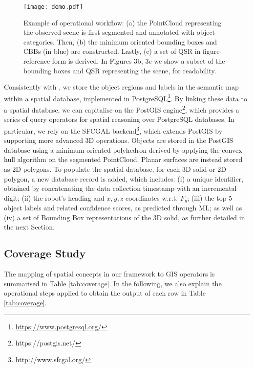 \documentclass{article}
\begin{document}
\begin{figure*}[t]
  \texttt{[image: demo.pdf]}
  \caption{Example of operational workflow: (a) the PointCloud representing the observed scene is first segmented and annotated with object categories. Then, (b) the minimum oriented bounding boxes and CBBs (in blue) are constructed. Lastly, (c) a set of QSR in figure-reference form is derived. In Figures 3b, 3c we show a subset of the bounding boxes and QSR representing the scene, for readability.}
  \label{fig:robot} 
\end{figure*}

Consistently with \cite{deeken_grounding_2018}, we store the object regions and labels in the semantic map within a spatial database, implemented in PostgreSQL\footnote{\url{https://www.postgresql.org/}}. By linking these data to a spatial database, we can capitalise on the PostGIS engine\footnote{https://postgis.net/}, which provides a series of query operators for spatial reasoning over PostgreSQL databases. In particular, we rely on the SFCGAL backend\footnote{http://www.sfcgal.org/}, which extends PostGIS by supporting more advanced 3D operations. Objects are stored in the PostGIS database using a minimum oriented polyhedron derived by applying the convex hull algorithm on the segmented PointCloud. Planar surfaces are instead stored as 2D polygons. To populate the spatial database, for each 3D solid or 2D polygon, a new database record is added, which includes: (i) a unique identifier, obtained by concatenating the data collection timestamp with an incremental digit; (ii) the robot's heading and $x,y,z$ coordinates w.r.t. $F_g$; (iii) the top-5 object labels and related confidence scores, as predicted through ML; as well as (iv) a set of Bounding Box representations of the 3D solid, as further detailed in the next Section.  

\subsection{Coverage Study}%
The mapping of spatial concepts in our framework to GIS operators is summarised in Table \ref{tab:coverage}. In the following, we also explain the operational steps applied to obtain the output of each row in Table \ref{tab:coverage}.
\end{document}
